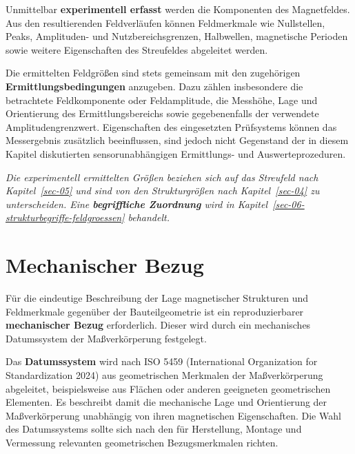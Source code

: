 \documentclass[
  ngerman,
  a4paper,
  twoside]{scrbook}
\newcounter{quartocallouttipno}
\newcommand{\quartocallouttip}[1]{\refstepcounter{quartocallouttipno}\label{#1}}
\begin{document}
Unmittelbar \textbf{experimentell erfasst} werden die Komponenten des
Magnetfeldes. Aus den resultierenden Feldverläufen können Feldmerkmale
wie Nullstellen, Peaks, Amplituden- und Nutzbereichsgrenzen, Halbwellen,
magnetische Perioden sowie weitere Eigenschaften des Streufeldes
abgeleitet werden.

Die ermittelten Feldgrößen sind stets gemeinsam mit den zugehörigen
\textbf{Ermittlungsbedingungen} anzugeben. Dazu zählen insbesondere die
betrachtete Feldkomponente oder Feldamplitude, die Messhöhe, Lage und
Orientierung des Ermittlungsbereichs sowie gegebenenfalls der verwendete
Amplitudengrenzwert. Eigenschaften des eingesetzten Prüfsystems können
das Messergebnis zusätzlich beeinflussen, sind jedoch nicht Gegenstand
der in diesem Kapitel diskutierten sensorunabhängigen Ermittlungs- und
Auswerteprozeduren.

\begin{tcolorbox}[enhanced jigsaw, arc=.35mm, bottomrule=.15mm, bottomtitle=1mm, breakable, colback=white, colbacktitle=quarto-callout-tip-color!10!white, colframe=quarto-callout-tip-color-frame, coltitle=black, left=2mm, leftrule=.75mm, opacityback=0, opacitybacktitle=0.6, rightrule=.15mm, title=\textcolor{quarto-callout-tip-color}{\faLightbulb}\hspace{0.5em}{Hinweis \ref*{tip-06-begriffliche-zuordnung}}, titlerule=0mm, toprule=.15mm, toptitle=1mm]

\quartocallouttip{tip-06-begriffliche-zuordnung} 

\emph{Die experimentell ermittelten Größen beziehen sich auf das
Streufeld nach Kapitel~\ref{sec-05} und sind von den Strukturgrößen nach
Kapitel~\ref{sec-04} zu unterscheiden. Eine \textbf{begriffliche
Zuordnung} wird in Kapitel~\ref{sec-06-strukturbegriffe-feldgroessen}
behandelt.}

\end{tcolorbox}

\section{Mechanischer Bezug}\label{sec-06-mech_bezug}

Für die eindeutige Beschreibung der Lage magnetischer Strukturen und
Feldmerkmale gegenüber der Bauteilgeometrie ist ein reproduzierbarer
\textbf{mechanischer Bezug} erforderlich. Dieser wird durch ein
mechanisches Datumssystem der Maßverkörperung festgelegt.

Das \textbf{Datumssystem} wird nach ISO 5459 (International Organization
for Standardization 2024) aus geometrischen Merkmalen der
Maßverkörperung abgeleitet, beispielsweise aus Flächen oder anderen
geeigneten geometrischen Elementen. Es beschreibt damit die mechanische
Lage und Orientierung der Maßverkörperung unabhängig von ihren
magnetischen Eigenschaften. Die Wahl des Datumssystems sollte sich nach
den für Herstellung, Montage und Vermessung relevanten geometrischen
Bezugsmerkmalen richten.
\end{document}
